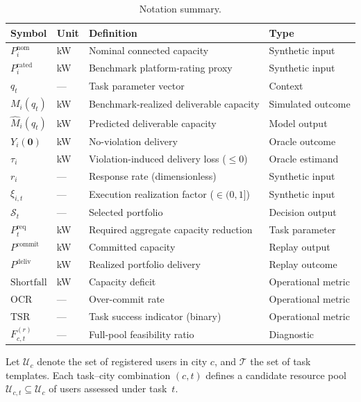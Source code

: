 \documentclass[utf8]{FrontiersinHarvard}
\newcommand{\Mhat}{\widehat{M}}
\newcommand{\Preq}{P^{\mathrm{req}}}
\newcommand{\Pcommit}{P^{\mathrm{commit}}}
\newcommand{\Pdeliv}{P^{\mathrm{deliv}}}
\newcommand{\Shortfall}{\mathrm{Shortfall}}
\newcommand{\OCR}{\mathrm{OCR}}
\newcommand{\TSR}{\mathrm{TSR}}
\begin{document}
\begin{table}[h!]
\centering
\caption{Notation summary.}
\label{tab:notation}
\small
\begin{tabular}{llll}
\toprule
\textbf{Symbol} & \textbf{Unit} & \textbf{Definition} & \textbf{Type} \\
\midrule
$P_i^{\mathrm{nom}}$ & kW & Nominal connected capacity & Synthetic input \\
$P_i^{\mathrm{rated}}$ & kW & Benchmark platform-rating proxy & Synthetic input \\
$q_t$ & --- & Task parameter vector & Context \\
$M_i(q_t)$ & kW & Benchmark-realized deliverable capacity & Simulated outcome \\
$\Mhat_i(q_t)$ & kW & Predicted deliverable capacity & Model output \\
$Y_i(\mathbf{0})$ & kW & No-violation delivery & Oracle outcome \\
$\tau_i$ & kW & Violation-induced delivery loss ($\leq 0$) & Oracle estimand \\
$r_i$ & --- & Response rate (dimensionless) & Synthetic input \\
$\xi_{i,t}$ & --- & Execution realization factor ($\in (0,1]$) & Synthetic input \\
$\mathcal{S}_t$ & --- & Selected portfolio & Decision output \\
$\Preq_t$ & kW & Required aggregate capacity reduction & Task parameter \\
$\Pcommit$ & kW & Committed capacity & Replay output \\
$\Pdeliv$ & kW & Realized portfolio delivery & Replay outcome \\
$\Shortfall$ & kW & Capacity deficit & Operational metric \\
$\OCR$ & --- & Over-commit rate & Operational metric \\
$\TSR$ & --- & Task success indicator (binary) & Operational metric \\
$F_{c,t}^{(r)}$ & --- & Full-pool feasibility ratio & Diagnostic \\
\bottomrule
\end{tabular}
\end{table}

Let $\mathcal{U}_c$ denote the set of registered users in city
$c$, and $\mathcal{T}$ the set of task templates. Each
task--city combination $(c, t)$ defines a candidate resource pool
$\mathcal{U}_{c,t} \subseteq \mathcal{U}_c$ of users assessed
under task~$t$.
\end{document}
